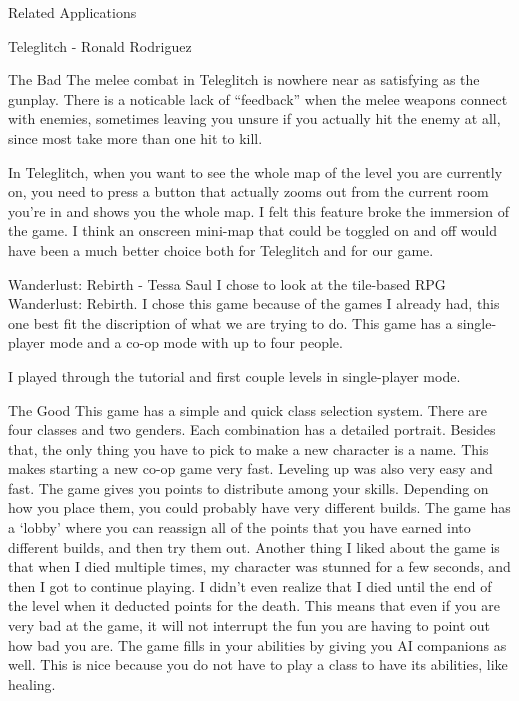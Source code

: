\documentclass[12pt]{report}
\begin{document}
\begin{section}{Related Applications}
\begin{subsection}{Teleglitch - Ronald Rodriguez}
\begin{subsubsection}{The Bad}
The melee combat in Teleglitch is nowhere near as satisfying as the
gunplay. There is a noticable lack of ``feedback'' when the melee weapons
connect with enemies, sometimes leaving you unsure if you actually hit the
enemy at all, since most take more than one hit to kill.  

In Teleglitch, when you want to see the whole map of the level you are
currently on, you need to press a button that actually zooms out from the
current room you're in and shows you the whole map. I felt this feature
broke the immersion of the game. I think an onscreen mini-map that 
could be toggled on and off would have been a much better choice both for
Teleglitch and for our game.
\end{subsubsection}

\end{subsection}

\begin{subsection}{Wanderlust: Rebirth - Tessa Saul}
I chose to look at the tile-based RPG Wanderlust: Rebirth. I chose this
game because of the games I already had, this one best fit the discription
of what we are trying to do. This game has a single-player mode and a co-op
mode with up to four people. 

I played through the tutorial and first couple levels in single-player
mode. 

\begin{subsubsection}{The Good}
This game has a simple and quick class selection system. There are four
classes and two genders. Each combination has a detailed portrait. Besides
that, the only thing you have to pick to make a new character is a name. 
This makes starting a new co-op game very fast.  
Leveling up was also very easy and fast. The game gives you points to
distribute among your skills. Depending on how you place them, you could 
probably have very different builds. The game has a `lobby' where you can
reassign all of the points that you have earned into different builds, and
then try them out. Another thing I liked about the game is that when I died
multiple times, my character was stunned for a few seconds, and then I got
to continue playing. I didn't even realize that I died until the end of
the level when it deducted points for the death. This means that even if
you are very bad at the game, it will not interrupt the fun you are having
to point out how bad you are. The game fills in your abilities by giving
you AI companions as well. This is nice because you do not have to play a
class to have its abilities, like healing. 
\end{subsubsection}


\end{subsection}
\end{section}
\end{document}
